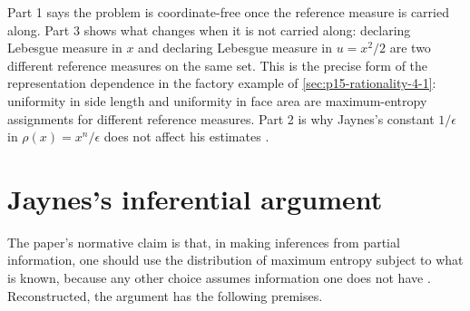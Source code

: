 Part 1 says the problem is coordinate-free once the reference measure is
carried along. Part 3 shows what changes when it is not carried along:
declaring Lebesgue measure in \(x\) and declaring Lebesgue measure in
\(u=x^2/2\) are two different reference measures on the same set. This is the
precise form of the representation dependence in the factory example of
\cref{sec:p15-rationality-4-1}: uniformity in side length and uniformity in
face area are maximum-entropy assignments for different reference measures.
Part 2 is why Jaynes's constant \(1/\epsilon\) in \(\rho(x)=x^n/\epsilon\) does not
affect his estimates \cite[p.~625]{Jaynes1957InformationTheory}.

\section{Jaynes's inferential argument}
\label{sec:p15-w02b-p15-043-jaynes}

The paper's normative claim is that, in making inferences from partial
information, one should use the distribution of maximum entropy subject to
what is known, because any other choice assumes information one does not
have \cite[p.~623]{Jaynes1957InformationTheory}. Reconstructed, the argument
has the following premises.

